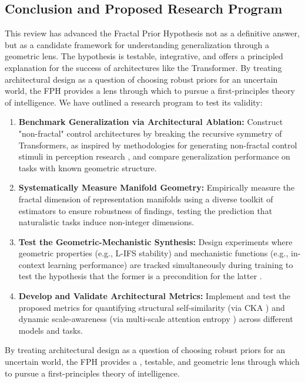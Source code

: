 \documentclass[11pt,a4paper]{article}
\begin{document}
\subsection{Conclusion and Proposed Research Program}
This review has advanced the Fractal Prior Hypothesis not as a definitive answer, but as a candidate framework for understanding generalization through a geometric lens. The hypothesis is testable, integrative, and offers a principled explanation for the success of architectures like the Transformer. By treating architectural design as a question of choosing robust priors for an uncertain world, the FPH provides a  lens through which to pursue a first-principles theory of intelligence. We have outlined a research program to test its validity:
\begin{enumerate}
    \item \textbf{Benchmark Generalization via Architectural Ablation:} Construct "non-fractal" control architectures by breaking the recursive symmetry of Transformers, as inspired by methodologies for generating non-fractal control stimuli in perception research \citep{spehar2023perceptual}, and compare generalization performance on tasks with known geometric structure.
    \item \textbf{Systematically Measure Manifold Geometry:} Empirically measure the fractal dimension of representation manifolds using a diverse toolkit of estimators \citep{fass2023estimating} to ensure robustness of findings, testing the prediction that naturalistic tasks induce non-integer dimensions.
    \item \textbf{Test the Geometric-Mechanistic Synthesis:} Design experiments where geometric properties (e.g., L-IFS stability) and mechanistic functions (e.g., in-context learning performance) are tracked simultaneously during training to test the hypothesis that the former is a precondition for the latter \citep{garg2022what, chan2023transient}.
    \item \textbf{Develop and Validate Architectural Metrics:} Implement and test the proposed metrics for quantifying structural self-similarity (via CKA \citep{kornblith2019similarity}) and dynamic scale-awareness (via multi-scale attention entropy \citep{costa2022multiscale}) across different models and tasks.
\end{enumerate}
By treating architectural design as a question of choosing robust priors for an uncertain world, the FPH provides a , testable, and geometric lens through which to pursue a first-principles theory of intelligence.



\end{document}
